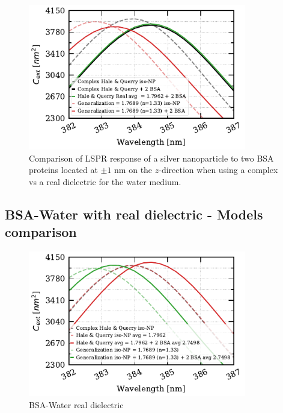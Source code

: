  \begin{figure} %
    \centering
    \includegraphics[width=0.85\textwidth]{bsa_w_real_water_diel.pdf} 
    \caption{Comparison of LSPR response of a silver nanoparticle to two BSA proteins located at $\pm1$ nm on the $z$-direction
    when using a complex vs a real dielectric for the water medium.}
    \label{fig:real_w_comp_bsa}
 \end{figure}

 \subsection{BSA-Water with real dielectric - Models comparison}

 \begin{figure} %
    \centering
    \includegraphics[width=0.85\textwidth]{bsa_phan_avg_real_water_diel.pdf} 
    \caption{BSA-Water real dielectric}
    \label{fig:bsa_w_real}
 \end{figure}

 